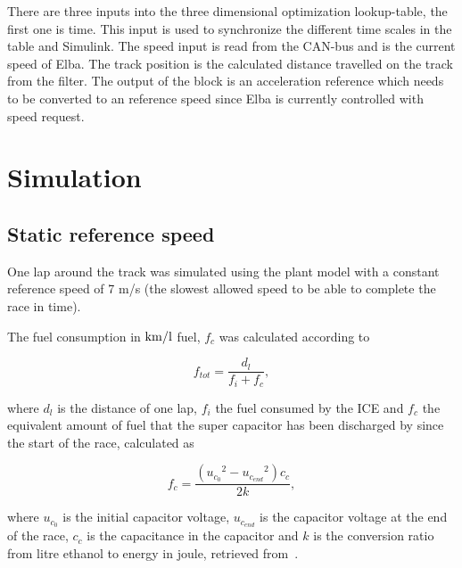 There are three inputs into the three dimensional optimization lookup-table, the first one is time. This input is used to synchronize the different time scales in the table and Simulink. The speed input is read from the CAN-bus and is the current speed of
Elba. The track position is the calculated distance travelled on the track from
the filter. The output of the block is an acceleration reference which needs to
be converted to an reference speed since Elba is currently controlled with speed
request. 

\section{Simulation}

\subsection{Static reference speed}
One lap around the track was simulated using the plant model with a constant reference speed of 7 m/s (the slowest allowed speed to be able to complete the race in time). %


The fuel consumption in $\textnormal{km/l}$ fuel, $f_c$ was calculated according to

\begin{equation} \label{eq:optimization_fuelconsumption}
	f_{tot} = \frac{d_l}{f_i+f_c},
\end{equation}

where $d_l$ is the distance of one lap, $f_i$ the fuel consumed by the ICE and
$f_c$ the equivalent amount of fuel that the super capacitor has been discharged
by since the start of the race, calculated as

\begin{equation} \label{eq:optimization_ethanolenergy}
	f_c = \frac{({{u_{c_0}}^2-{u_{c_{end}}}^2})c_c}{2k},
\end{equation}

where $u_{c_0}$ is the initial capacitor voltage, $u_{c_{end}}$ is the capacitor
voltage at the end of the race, $c_c$ is the capacitance in the capacitor and
$k$ is the conversion ratio from litre ethanol to energy in joule, retrieved
from~\cite{fuelconversion}.

